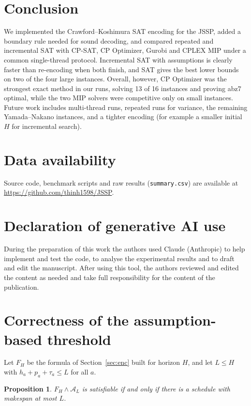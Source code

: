 \documentclass[a4paper,fleqn]{cas-sc}
\newtheorem{proposition}{Proposition}
\begin{document}
\section{Conclusion}\label{sec:concl}
We implemented the Crawford--Koshimura SAT encoding for the JSSP, added a boundary rule needed for sound decoding, and compared repeated and incremental SAT with CP-SAT, CP Optimizer, Gurobi and CPLEX MIP under a common single-thread protocol.
Incremental SAT with assumptions is clearly faster than re-encoding when both finish, and SAT gives the best lower bounds on two of the four large instances.
Overall, however, CP Optimizer was the strongest exact method in our runs, solving 13 of 16 instances and proving abz7 optimal, while the two MIP solvers were competitive only on small instances.
Future work includes multi-thread runs, repeated runs for variance, the remaining Yamada--Nakano instances, and a tighter encoding (for example a smaller initial $H$ for incremental search).

\section*{Data availability}
Source code, benchmark scripts and raw results (\texttt{summary.csv}) are available at \url{https://github.com/thinh1598/JSSP}.

\section*{Declaration of generative AI use}
During the preparation of this work the authors used Claude (Anthropic) to help implement and test the code, to analyse the experimental results and to draft and edit the manuscript. After using this tool, the authors reviewed and edited the content as needed and take full responsibility for the content of the publication.

\appendix
\section{Correctness of the assumption-based threshold}\label{app:a}
Let $F_H$ be the formula of Section~\ref{sec:enc} built for horizon $H$, and let $L\le H$ with $h_a+p_a+\tau_a\le L$ for all $a$.

\begin{proposition}
$F_H\wedge\mathcal A_L$ is satisfiable if and only if there is a schedule with makespan at most $L$.
\end{proposition}
\end{document}
